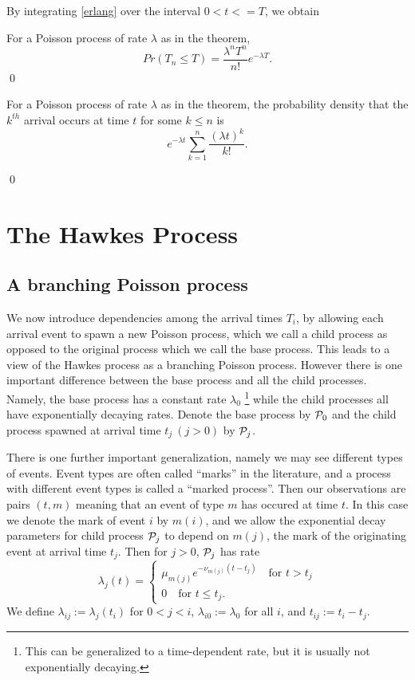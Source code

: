 \documentclass[12pt,leqno]{article}
\begin{document}
By integrating \eqref{erlang} over the interval $0<t<=T$, we obtain
\begin{Cor}
  For a Poisson process of rate $\lambda$ as in the theorem, 
  \begin{equation}\label{poisson}
  Pr(T_n \le T) = \frac{\lambda^nT^{n}}{n!}e^{-\lambda{T}}.
  \end{equation}
  \qed
\end{Cor}

\begin{Cor}\label{Pr(obs|state)}
  For a Poisson process of rate $\lambda$ as in the theorem, the probability density that the $k^{th}$ arrival occurs at
  time $t$ for some $k \le n$ is
  \begin{equation}
    e^{-\lambda{t}}\sum_{k=1}^{n}\frac{(\lambda{t})^k}{k!}.
  \end{equation}
\end{Cor}\qed

\section{The Hawkes Process}
\subsection{A branching Poisson process}
We now introduce dependencies among the arrival times $T_i$, by allowing each arrival event 
to spawn a new Poisson process, which we call a child process as opposed to the original process which we
call the base process.  This leads to a view of the
Hawkes process as a branching Poisson process.  However there is one important difference between the base process and
all the child processes.  Namely, the base process has a constant rate $\lambda_0$ \footnote{This can be generalized to a time-dependent rate, but it is usually not exponentially decaying.} while the child processes
all have exponentially decaying rates.  Denote the base
process by ${\cal{P}}_0$ and  the child process spawned at arrival time
$t_j~(j > 0)$ by ${\cal{P}}_j$.  

There is one further important generalization, namely we may see
different types of events.  Event types are often called ``marks'' in the literature, and a process with different
event types is called a ``marked process''. 
Then our observations are pairs $(t,m)$ meaning that an event of type $m$ has occured at time $t$.  In this
case we denote the mark of event $i$ by $m(i)$, and we allow the exponential decay parameters for child process
${\cal{P}}_j$ to depend on $m(j)$, the mark of the originating event at arrival time $t_j$.  Then for $j>0$,
${\cal{P}}_j$ has rate
\begin{equation}\label{child_rate}
\lambda_j(t) =
\begin{cases}
  \mu_{m(j)}e^{-\nu_{m(j)}(t-t_j)}\quad\text{for $t > t_j$}\\
  0\quad\text{for $t \le t_j$}.
\end{cases}
\end{equation}
We define $\lambda_{ij} := \lambda_j(t_i)$ for $0 <j < i$,
$\lambda_{i0} := \lambda_0$ for all $i$, and $t_{ij} := t_i-t_j$.
\end{document}

